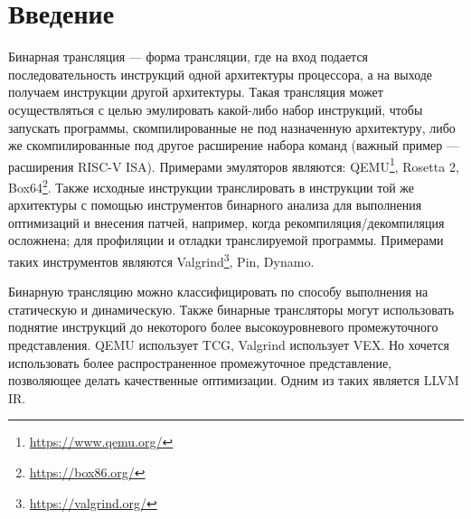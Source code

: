 
\section*{Введение}
\thispagestyle{withCompileDate}



Бинарная трансляция --- форма трансляции, где на вход подается последовательность инструкций одной архитектуры процессора, а на выходе получаем инструкции другой архитектуры. Такая трансляция может осуществляться с целью эмулировать какой-либо набор инструкций, чтобы запускать программы, скомпилированные не под назначенную архитектуру, либо же скомпилированные под другое расширение набора команд (важный пример --- расширения RISC-V ISA).  Примерами эмуляторов являются: QEMU\footnote{\href{https://www.qemu.org/}{https://www.qemu.org/}}, Rosetta 2, Box64\footnote{\href{https://box86.org/}{https://box86.org/}}. Также исходные инструкции транслировать в инструкции той же архитектуры с помощью инструментов бинарного анализа для выполнения оптимизаций и внесения патчей, например, когда рекомпиляция/декомпиляция осложнена; для профиляции и отладки транслируемой программы. Примерами таких инструментов являются Valgrind\footnote{\href{https://valgrind.org/}{https://valgrind.org/}}, Pin, Dynamo.

Бинарную трансляцию можно классифицировать по способу выполнения на статическую и динамическую.
Также бинарные трансляторы могут использовать поднятие инструкций до некоторого более высокоуровневого промежуточного представления. QEMU использует TCG, Valgrind использует VEX. Но хочется использовать более распространенное промежуточное представление, позволяющее делать качественные оптимизации. Одним из таких является LLVM IR.

